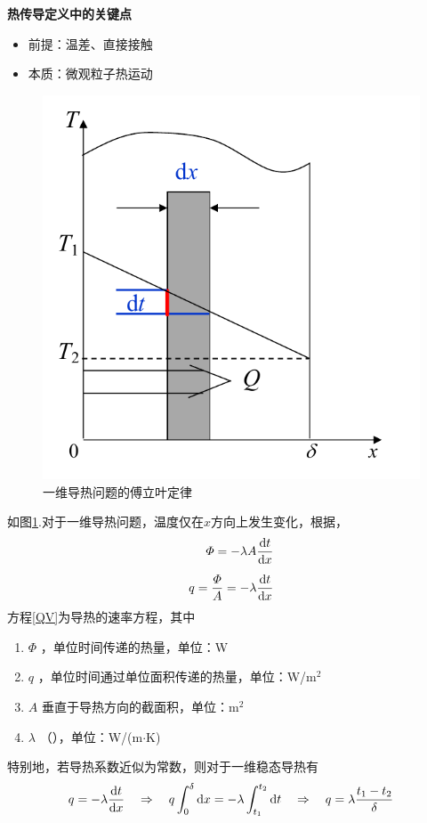 \noindent \textbf{热传导定义中的关键点}\vspace*{-0.5em}
\begin{itemize}
	\item 前提：温差、直接接触\vspace*{-0.5em}
	\item 本质：微观粒子热运动
\end{itemize}

\begin{figure}[!htb]
	\centering
	\includegraphics[width=0.3\linewidth]{pic/一维傅立叶.pdf}
	\vspace*{-1.5em}
	\caption{一维导热问题的傅立叶定律}
	\label{一维傅立叶}
\end{figure}

\theorem[傅立叶定律]
如图\ref{一维傅立叶}.对于一维导热问题，温度仅在$x$方向上发生变化，根据，
\begin{align}
	\varPhi = - \lambda A \dfrac{{\rm{d}} t}{{\rm{d}} x}
	\label{QV}\\[0.5em]
	q = \dfrac{\varPhi}{A} = - \lambda \dfrac{{\rm{d}} t}{{\rm{d}} x}
\end{align}
方程\eqref{QV}为导热的速率方程，其中
\begin{enumerate}[\hspace*{1.5em}]
	\item $\varPhi$ \quad {}，单位时间传递的热量，单位：W\vspace*{-0.5em}
	\item $q$ \quad {}，单位时间通过单位面积传递的热量，单位：W/$\text{m}^2$\vspace*{-0.5em}
	\item $A$ \quad 垂直于导热方向的截面积，单位：$\text{m}^2$\vspace*{-0.5em}
	\item $\lambda$ \quad {}（），单位：W/(m$\cdot$K)\vspace*{-0.5em}
\end{enumerate}

\noindent 特别地，若导热系数近似为常数，则对于一维稳态导热有
\begin{align}
	q = - \lambda \dfrac{{\rm{d}} t}{{\rm{d}} x} \quad \Rightarrow \quad q \int_{0}^{\delta } {\rm{d}} x = - \lambda \int_{t_1}^{t_2} {\rm{d}} t \quad \Rightarrow \quad q = \lambda \dfrac{t_1 - t_2}{\delta}
\end{align}


